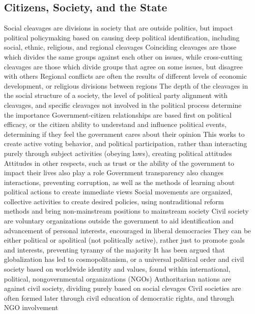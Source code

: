 \documentclass[11 pt, twoside]{article}
\newenvironment{outline*}
{
	\begin{outline}[enumerate]
	}
	{\end{outline}
}
\begin{document}
\subsection{Citizens, Society, and the State}
\begin{outline*}
\1 Social cleavages are divisions in society that are outside politics, but impact political policymaking based on causing deep political identification, including social, ethnic, religious, and regional cleavages
\2 Coinciding cleavages are those which divides the same groups against each other on issues, while cross-cutting cleavages are those which divide groups that agree on some issues, but disagree with others
\2 Regional conflicts are often the results of different levels of economic development, or religious divisions between regions
\2 The depth of the cleavages in the social structure of a society, the level of political party alignment with cleavages, and specific cleavages not involved in the political process determine the importance
\1 Government-citizen relationships are based first on political efficacy, or the citizen ability to understand and influence political events, determining if they feel the government cares about their opinion
\2 This works to create active voting behavior, and political participation, rather than interacting purely through subject activities (obeying laws), creating political attitudes
\2 Attitudes in other respects, such as trust or the ability of the government to impact their lives also play a role
\2 Government transparency also changes interactions, preventing corruption, as well as the methods of learning about political actions to create immediate views
\1 Social movements are organized, collective activities to create desired policies, using nontraditional reform methods and bring non-mainstream positions to mainstream society
\1 Civil society are voluntary organizations outside the government to aid identification and advancement of personal interests, encouraged in liberal democracies
\2 They can be either political or apolitical (not politically active), rather just to promote goals and interests, preventing tyranny of the majority
\2 It has been argued that globalization has led to cosmopolitanism, or a universal political order and civil society based on worldwide identity and values, found within international, political, nongovernmental organizations (NGOs)
\2 Authoritarian nations are against civil society, dividing purely based on social clevages
\3 Civil societies are often formed later through civil education of democratic rights, and through NGO involvement
\end{outline*}
\end{document}
